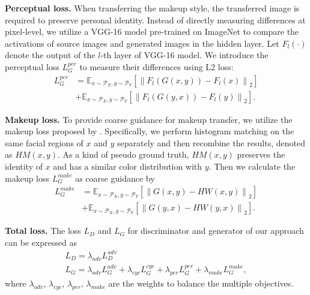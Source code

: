 \textbf{Perceptual loss.} When transferring the makeup style, the transferred image is required to preserve personal identity. Instead of directly measuring differences at pixel-level, we utilize a VGG-16 model pre-trained on ImageNet to compare the activations of source images and generated images in the hidden layer. Let $F_l(\cdot)$ denote the output of the $l$-th layer of VGG-16 model. We introduce the perceptual loss $L_G^{per}$ to measure their differences using L2 loss:
\begin{equation}
    \begin{aligned}
        L_G^{per} &=\mathbb{E}_{x \sim \mathcal{P}_{X}, y \sim \mathcal{P}_{Y}}\left[ \left\| F_l(G(x, y)) - F_l(x) \right\|_{2} \right]  \\ &+\mathbb{E}_{x \sim \mathcal{P}_{X}, y \sim \mathcal{P}_{Y}}\left[ \left\| F_l(G(y, x)) - F_l(y) \right\|_{2} \right].
    \end{aligned}
\end{equation}

\textbf{Makeup loss.} To provide coarse guidance for makeup transfer, we utilize the makeup loss proposed by \cite{Li2018BeautyGANIF}. Specifically, we perform histogram matching on the same facial regions of $x$ and $y$ separately and then recombine the results, denoted as $HM(x, y)$. As a kind of pseudo ground truth, $HM(x, y)$ preserves the identity of $x$ and has a similar color distribution with $y$. Then we calculate the makeup loss $L_G^{make}$ as coarse guidance by
\begin{equation}
    \begin{aligned}
        L_G^{make} &= \mathbb{E}_{x \sim \mathcal{P}_{X}, y \sim \mathcal{P}_{Y}}\left[ \left\| G(x, y) - HW(x, y) \right\|_{2} \right]  \\ &+\mathbb{E}_{x \sim \mathcal{P}_{X}, y \sim \mathcal{P}_{Y}}\left[ \left\| G(y, x) - HW(y, x) \right\|_{2} \right].
    \end{aligned}
\end{equation}

\textbf{Total loss.} The loss $L_D$ and $L_G$ for discriminator and generator of our approach can be expressed as
\begin{equation}
    \begin{gathered}
            L_D = \lambda_{adv} L_D^{adv} \\
            L_G = \lambda_{adv} L_G^{adv} + \lambda_{cyc} L_G^{cyc} + \lambda_{per} L_G^{per} + \lambda_{make} L_G^{make},
    \end{gathered} 
\end{equation}
where $\lambda_{adv}$, $\lambda_{cyc}$, $\lambda_{per}$, $\lambda_{make}$ are the weights to balance the multiple objectives. 

